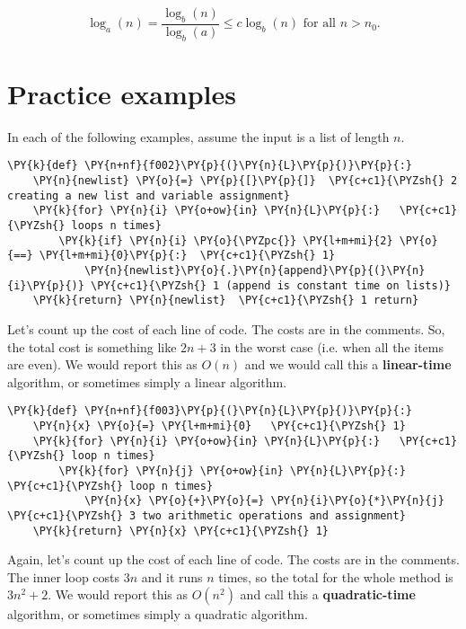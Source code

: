 \[
\log_a(n) = \frac{\log_b(n)}{\log_b(a)} \le c \log_b(n) \text{ for all }n>n_0.
\]

\section{Practice examples}


In each of the following examples, assume the input is a list of length $n$.

\begin{Verbatim}[commandchars=\\\{\}]
\PY{k}{def} \PY{n+nf}{f002}\PY{p}{(}\PY{n}{L}\PY{p}{)}\PY{p}{:}    
    \PY{n}{newlist} \PY{o}{=} \PY{p}{[}\PY{p}{]}  \PY{c+c1}{\PYZsh{} 2 creating a new list and variable assignment}
    \PY{k}{for} \PY{n}{i} \PY{o+ow}{in} \PY{n}{L}\PY{p}{:}   \PY{c+c1}{\PYZsh{} loops n times}
        \PY{k}{if} \PY{n}{i} \PY{o}{\PYZpc{}} \PY{l+m+mi}{2} \PY{o}{==} \PY{l+m+mi}{0}\PY{p}{:}  \PY{c+c1}{\PYZsh{} 1}
            \PY{n}{newlist}\PY{o}{.}\PY{n}{append}\PY{p}{(}\PY{n}{i}\PY{p}{)} \PY{c+c1}{\PYZsh{} 1 (append is constant time on lists)}
    \PY{k}{return} \PY{n}{newlist}  \PY{c+c1}{\PYZsh{} 1 return}
\end{Verbatim}



Let's count up the cost of each line of code.
The costs are in the comments.
So, the total cost is something like $2n+3$ in the worst case (i.e. when all the items are even).
We would report this as $O(n)$ and we would call this a \textbf{linear-time} algorithm, or sometimes simply a linear algorithm.

\begin{Verbatim}[commandchars=\\\{\}]
\PY{k}{def} \PY{n+nf}{f003}\PY{p}{(}\PY{n}{L}\PY{p}{)}\PY{p}{:}
    \PY{n}{x} \PY{o}{=} \PY{l+m+mi}{0}   \PY{c+c1}{\PYZsh{} 1}
    \PY{k}{for} \PY{n}{i} \PY{o+ow}{in} \PY{n}{L}\PY{p}{:}   \PY{c+c1}{\PYZsh{} loop n times}
        \PY{k}{for} \PY{n}{j} \PY{o+ow}{in} \PY{n}{L}\PY{p}{:}   \PY{c+c1}{\PYZsh{} loop n times}
            \PY{n}{x} \PY{o}{+}\PY{o}{=} \PY{n}{i}\PY{o}{*}\PY{n}{j}  \PY{c+c1}{\PYZsh{} 3 two arithmetic operations and assignment}
    \PY{k}{return} \PY{n}{x} \PY{c+c1}{\PYZsh{} 1}
\end{Verbatim}



Again, let's count up the cost of each line of code.
The costs are in the comments.
The inner loop costs $3n$ and it runs $n$ times, so the total for the whole method is $3n^2 + 2$.
We would report this as $O(n^2)$ and call this a \textbf{quadratic-time} algorithm, or sometimes simply a quadratic algorithm.



